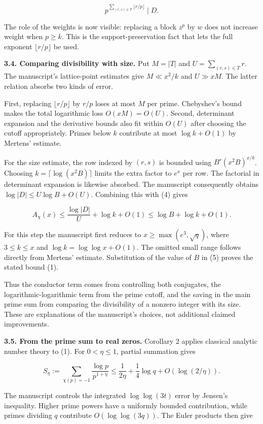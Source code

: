 \documentclass[11pt]{article}
\begin{document}
\[
p^{\sum_{(r,s)\in T}\lfloor r/p\rfloor}\mid D.
\tag{4}
\]

The role of the weights is now visible: replacing a block \(z^p\) by \(w\) does not increase weight when \(p\ge k\). This is the support-preservation fact that lets the full exponent \(\lfloor r/p\rfloor\) be used.

\textbf{3.4. Comparing divisibility with size.} Put \(M=|T|\) and \(U=\sum_{(r,s)\in T}r\). The manuscript's lattice-point estimates give \(M\ll x^2/k\) and \(U\gg xM\). The latter relation absorbs two kinds of error.

First, replacing \(\lfloor r/p\rfloor\) by \(r/p\) loses at most \(M\) per prime. Chebyshev's bound makes the total logarithmic loss \(O(xM)=O(U)\). Second, determinant expansion and the derivative bounds also fit within \(O(U)\) after choosing the cutoff appropriately. Primes below \(k\) contribute at most \(\log k+O(1)\) by Mertens' estimate.

For the size estimate, the row indexed by \((r,s)\) is bounded using \(B^r(x^2B)^{x/k}\). Choosing \(k=\lceil\log(x^2B)\rceil\) limits the extra factor to \(e^x\) per row. The factorial in determinant expansion is likewise absorbed. The manuscript consequently obtains \(\log|D|\le U\log B+O(U)\). Combining this with (4) gives

\[
A_\chi(x)
\le\frac{\log|D|}{U}+\log k+O(1)
\le\log B+\log k+O(1).
\tag{5}
\]

For this step the manuscript first reduces to \(x\ge\max(e^3,\sqrt q)\), where \(3\le k\le x\) and \(\log k=\log\log x+O(1)\). The omitted small range follows directly from Mertens' estimate. Substitution of the value of \(B\) in (5) proves the stated bound (1).

Thus the conductor term comes from controlling both conjugates, the logarithmic-logarithmic term from the prime cutoff, and the saving in the main prime sum from comparing the divisibility of a nonzero integer with its size. These are explanations of the manuscript's choices, not additional claimed improvements.

\textbf{3.5. From the prime sum to real zeros.} Corollary 2 applies classical analytic number theory to (1). For \(0<\eta\le1\), partial summation gives

\[
S_\eta:=\sum_{\chi(p)=-1}\frac{\log p}{p^{1+\eta}}
\le\frac{1}{2\eta}+\frac14\log q+O(\log(2/\eta)).
\tag{6}
\]

The manuscript controls the integrated \(\log\log(3t)\) error by Jensen's inequality. Higher prime powers have a uniformly bounded contribution, while primes dividing \(q\) contribute \(O(\log\log(3q))\). The Euler products then give
\end{document}
